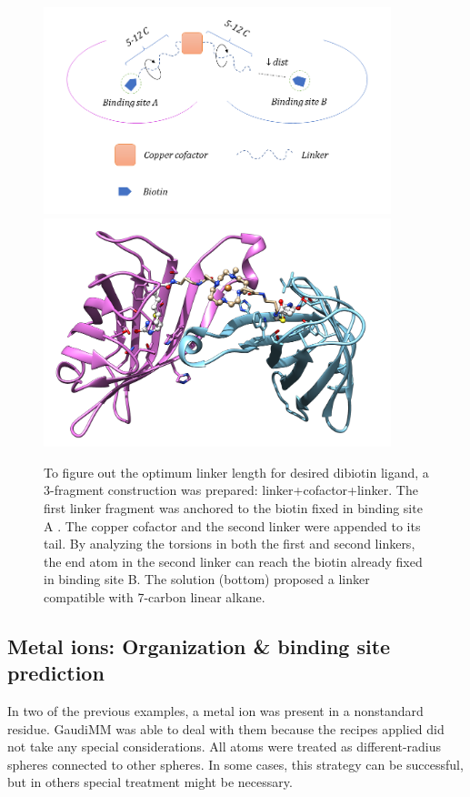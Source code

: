 \begin{figure}
	\begin{Center}
		\includegraphics[width=0.9\textwidth]{./figures/06/dibiotin-scheme.png} \\
		\includegraphics[width=0.9\textwidth]{./figures/06/dibiotin-solution.png}
	\end{Center}
	\caption[Linker length optimization]{To figure out the optimum linker length for  desired dibiotin ligand, a 3-fragment construction was prepared: linker+cofactor+linker. The first linker fragment was anchored to the biotin fixed in binding site A . The copper cofactor and the second linker were appended to its tail. By analyzing the torsions in both the first and second linkers, the end atom in the second linker can reach the biotin already fixed in binding site B. The solution (bottom) proposed a linker compatible with 7-carbon linear alkane.}
	\label{fig:dibiotin-linker-length}
\end{figure}


\subsection{Metal ions: Organization \& binding site prediction}
\label{section:metal-applications}
In two of the previous examples, a metal ion was present in a nonstandard residue. GaudiMM was able to deal with them because the recipes applied did not take any special considerations. All atoms were treated as different-radius spheres connected to other spheres. In some cases, this strategy can be successful, but in others special treatment might be necessary.

